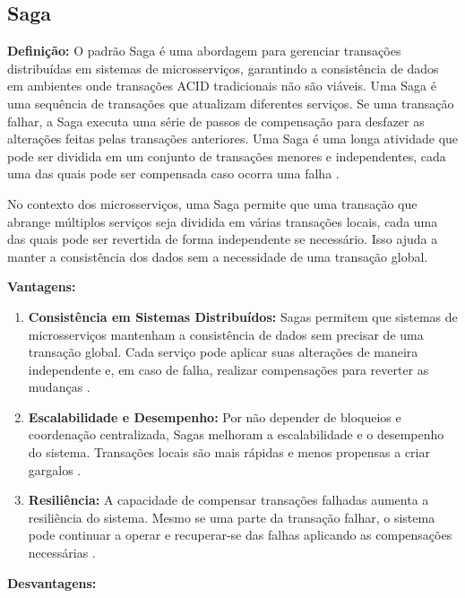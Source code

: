 \subsection{Saga}

\textbf{Definição:} O padrão Saga é uma abordagem para gerenciar transações distribuídas em sistemas de microsserviços, garantindo a consistência de dados em ambientes onde transações ACID tradicionais não são viáveis. Uma Saga é uma sequência de transações que atualizam diferentes serviços. Se uma transação falhar, a Saga executa uma série de passos de compensação para desfazer as alterações feitas pelas transações anteriores. Uma Saga é uma longa atividade que pode ser dividida em um conjunto de transações menores e independentes, cada uma das quais pode ser compensada caso ocorra uma falha \cite{garcia-molina1987}.

No contexto dos microsserviços, uma Saga permite que uma transação que abrange múltiplos serviços seja dividida em várias transações locais, cada uma das quais pode ser revertida de forma independente se necessário. Isso ajuda a manter a consistência dos dados sem a necessidade de uma transação global.

\textbf{Vantagens:}

\begin{enumerate}
    \item \textbf{Consistência em Sistemas Distribuídos:} Sagas permitem que sistemas de microsserviços mantenham a consistência de dados sem precisar de uma transação global. Cada serviço pode aplicar suas alterações de maneira independente e, em caso de falha, realizar compensações para reverter as mudanças \cite{richardson2018}.
    \item \textbf{Escalabilidade e Desempenho:} Por não depender de bloqueios e coordenação centralizada, Sagas melhoram a escalabilidade e o desempenho do sistema. Transações locais são mais rápidas e menos propensas a criar gargalos \cite{fowler2011}.
    \item \textbf{Resiliência:} A capacidade de compensar transações falhadas aumenta a resiliência do sistema. Mesmo se uma parte da transação falhar, o sistema pode continuar a operar e recuperar-se das falhas aplicando as compensações necessárias \cite{garcia-molina1987}.
\end{enumerate}

\textbf{Desvantagens:}

